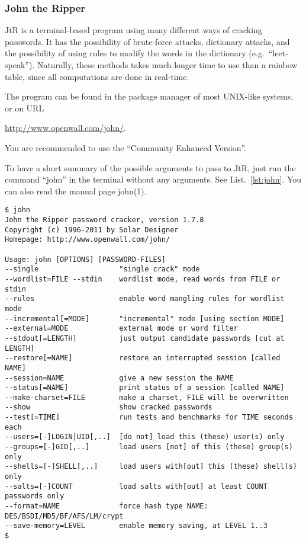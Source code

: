 \subsubsection{John the Ripper}

\ac{JtR} is a terminal-based program using many different ways of cracking 
passwords.
It has the possibility of brute-force attacks, dictionary attacks, and the 
possibility of using rules to modify the words in the dictionary 
(e.g.~\enquote{leet-speak}).
Naturally, these methods takes much longer time to use than a rainbow table, 
since all computations are done in real-time.

The program can be found in the package manager of most UNIX-like systems, or 
on URL
\begin{center}
  \url{http://www.openwall.com/john/}.
\end{center}
You are recommended to use the \enquote{Community Enhanced Version}.

To have a short summary of the possible arguments to pass to \ac{JtR}, just run 
the command \enquote{john} in the terminal without any arguments.
See List.~\ref{lst:john}.
You can also read the manual page john(1).

\begin{lstlisting}[float,caption={Output from \ac{JtR} in the 
terminal.},label={lst:john},breaklines=false]
$ john
John the Ripper password cracker, version 1.7.8
Copyright (c) 1996-2011 by Solar Designer
Homepage: http://www.openwall.com/john/

Usage: john [OPTIONS] [PASSWORD-FILES]
--single                   "single crack" mode
--wordlist=FILE --stdin    wordlist mode, read words from FILE or stdin
--rules                    enable word mangling rules for wordlist mode
--incremental[=MODE]       "incremental" mode [using section MODE]
--external=MODE            external mode or word filter
--stdout[=LENGTH]          just output candidate passwords [cut at LENGTH]
--restore[=NAME]           restore an interrupted session [called NAME]
--session=NAME             give a new session the NAME
--status[=NAME]            print status of a session [called NAME]
--make-charset=FILE        make a charset, FILE will be overwritten
--show                     show cracked passwords
--test[=TIME]              run tests and benchmarks for TIME seconds each
--users=[-]LOGIN|UID[,..]  [do not] load this (these) user(s) only
--groups=[-]GID[,..]       load users [not] of this (these) group(s) only
--shells=[-]SHELL[,..]     load users with[out] this (these) shell(s) only
--salts=[-]COUNT           load salts with[out] at least COUNT passwords only
--format=NAME              force hash type NAME: DES/BSDI/MD5/BF/AFS/LM/crypt
--save-memory=LEVEL        enable memory saving, at LEVEL 1..3
$
\end{lstlisting}

